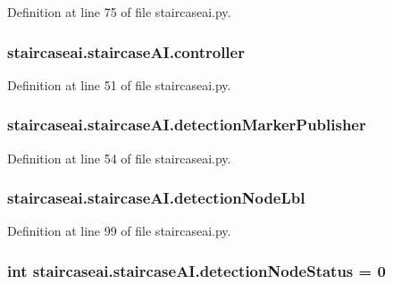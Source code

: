 Definition at line 75 of file staircaseai.\-py.

\hypertarget{classstaircaseai_1_1staircaseAI_aae321ff5a9a1cffe907c562ba4c6b39f}{
\subsubsection[{controller}]{\setlength{\rightskip}{0pt plus 5cm}staircaseai.\-staircase\-A\-I.\-controller}}\label{classstaircaseai_1_1staircaseAI_aae321ff5a9a1cffe907c562ba4c6b39f}


Definition at line 51 of file staircaseai.\-py.

\hypertarget{classstaircaseai_1_1staircaseAI_a94eefb2cb8d38235945f714fe35b2e5b}{
\subsubsection[{detection\-Marker\-Publisher}]{\setlength{\rightskip}{0pt plus 5cm}staircaseai.\-staircase\-A\-I.\-detection\-Marker\-Publisher}}\label{classstaircaseai_1_1staircaseAI_a94eefb2cb8d38235945f714fe35b2e5b}


Definition at line 54 of file staircaseai.\-py.

\hypertarget{classstaircaseai_1_1staircaseAI_ab2a668e0ee4a8c8eed4982275a34b9f8}{
\subsubsection[{detection\-Node\-Lbl}]{\setlength{\rightskip}{0pt plus 5cm}staircaseai.\-staircase\-A\-I.\-detection\-Node\-Lbl}}\label{classstaircaseai_1_1staircaseAI_ab2a668e0ee4a8c8eed4982275a34b9f8}


Definition at line 99 of file staircaseai.\-py.

\hypertarget{classstaircaseai_1_1staircaseAI_af1b341a22ebf3a672a1168cb7bed7a18}{
\subsubsection[{detection\-Node\-Status}]{\setlength{\rightskip}{0pt plus 5cm}int staircaseai.\-staircase\-A\-I.\-detection\-Node\-Status = 0\hspace{0.3cm}{\ttfamily [static]}}}\label{classstaircaseai_1_1staircaseAI_af1b341a22ebf3a672a1168cb7bed7a18}


